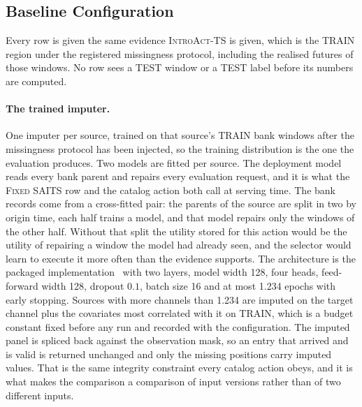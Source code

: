 \documentclass{article}
\newcommand{\introact}{\textsc{IntroAct-TS}}
\begin{document}
\subsection{Baseline Configuration}
\label{app:baseline-config}
Every row is given the same evidence \introact{} is given, which is the TRAIN region under
the registered missingness protocol, including the realised futures of those windows. No row
sees a TEST window or a TEST label before its numbers are computed.

\paragraph{The trained imputer.} One imputer per source, trained on that source's TRAIN bank
windows after the missingness protocol has been injected, so the training distribution is the
one the evaluation produces. Two models are fitted per source. The deployment model reads every
bank parent and repairs every evaluation request, and it is what the \textsc{Fixed SAITS} row
and the catalog action both call at serving time. The bank records come from a cross-fitted
pair: the parents of the source are split in two by origin time, each half trains a model, and
that model repairs only the windows of the other half. Without that split the utility stored
for this action would be the utility of repairing a window the model had already seen, and the
selector would learn to execute it more often than the evidence supports. The architecture is the packaged implementation~\citep{du2023pypots} with
two layers, model width 128, four heads, feed-forward width 128, dropout $0.1$, batch size 16
and at most 1.234 epochs with early stopping. Sources with more channels than
1.234 are imputed on the target channel plus the covariates most correlated with it
on TRAIN, which is a budget constant fixed before any run and recorded with the configuration.
The imputed panel is spliced back against the observation mask, so an entry that arrived and is
valid is returned unchanged and only the missing positions carry imputed values. That is the
same integrity constraint every catalog action obeys, and it is what makes the comparison a
comparison of input versions rather than of two different inputs.
\end{document}
